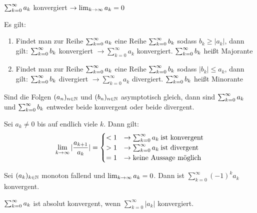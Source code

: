 \begin{satz}[Konvergenzkriterium]
	 $\sum_{k = 0}^{\infty} a_{k} $ konvergiert $\rightarrow \lim_{k \rightarrow \infty} a_k = 0$
\end{satz}

\begin{satz}[Majorantenkriterium]
	Es gilt:
	\begin{enumerate}[noitemsep]
		\item Findet man zur Reihe	$\sum_{k = 0}^{\infty} a_{k}$ eine Reihe $\sum_{k = 0}^{\infty} b_{k} $ sodass $b_k \geq |a_k|$, dann gilt: $\sum_{k = 0}^{\infty} b_{k}$ konvergiert $\rightarrow \sum_{k=0}^{\infty} a_k $ konvergiert. $\sum_{k = 0}^{\infty} b_{k} $ heißt Majorante
		\item Findet man zur Reihe	$\sum_{k = 0}^{\infty} a_{k}$ eine Reihe $\sum_{k = 0}^{\infty} b_{k} $ sodass $|b_k| \leq a_k$, dann gilt: $\sum_{k = 0}^{\infty} b_{k}$ divergiert $\rightarrow \sum_{k=0}^{\infty} a_k $ divergiert. $\sum_{k = 0}^{\infty} b_{k} $ heißt Minorante	
	\end{enumerate}
\end{satz}

\begin{satz}[Konvergenzkriterium]
	Sind die Folgen $(a_{n})_{n \in \mathbb{N}}$ und $(b_{n})_{n \in \mathbb{N}}$ asymptotisch gleich, dann sind $\sum_{k = 0}^{\infty} a_{k}$ und $\sum_{k = 0}^{\infty} b_{k}$ entweder beide konvergent oder beide divergent.
\end{satz}

\begin{satz}[Quotientenkriterium]
	Sei $a_k \neq 0$ bis auf endlich viele $k$. Dann gilt:
	\begin{equation}
		\lim_{k \rightarrow \infty} | \frac{a_{k + 1}}{a_k} | = 
		\begin{cases}
		< 1 & \rightarrow \sum_{k=0}^{\infty} a_k \medspace \textnormal{ist konvergent} \\ 
		> 1 & \rightarrow \sum_{k=0}^{\infty} a_k \medspace \textnormal{ist divergent}  \\
		= 1 & \rightarrow \textnormal{keine Aussage möglich}
		\end{cases}
	\end{equation}
\end{satz}

\begin{satz}[Leibnizkriterium]
	Sei $(a_k)_{k \in \mathbb{N}}$ monoton fallend und $\lim_{k \rightarrow \infty} a_k = 0$. Dann ist $\sum_{k=0}^{\infty} (-1)^k a_k$ konvergent.
\end{satz}

\begin{definition}
	$\sum_{k = 0}^{\infty} a_{k}$ ist absolut konvergent, wenn 	$\sum_{k=0}^{\infty} | a_k | $ konvergiert.
\end{definition}

